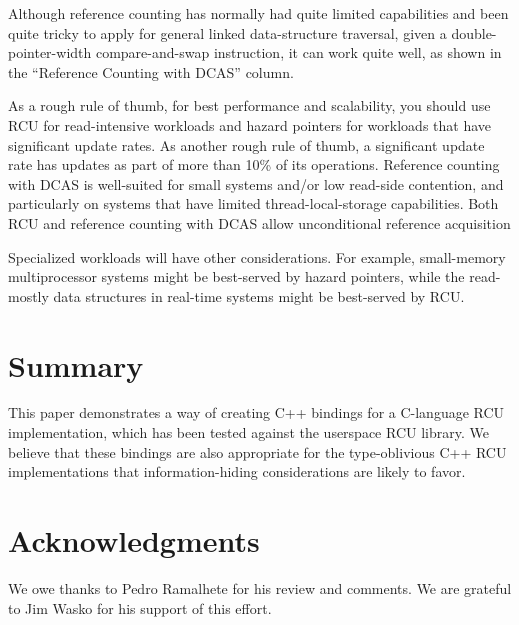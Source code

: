\documentclass[letterpaper,twocolumn,10pt]{article}
\begin{document}
Although reference counting has normally had quite limited capabilities
and been quite tricky to apply for general linked data-structure
traversal, given a double-pointer-width compare-and-swap instruction,
it can work quite well, as shown in the ``Reference Counting with DCAS''
column.

As a rough rule of thumb, for best performance and scalability, you
should use RCU for read-intensive workloads and hazard pointers for
workloads that have significant update rates.
As another rough rule of thumb, a significant update rate has updates
as part of more than 10\% of its operations.
Reference counting with DCAS is well-suited for small systems and/or
low read-side contention, and particularly on systems that have limited
thread-local-storage capabilities.
Both RCU and reference counting with DCAS allow unconditional reference
acquisition

Specialized workloads will have other considerations.
For example, small-memory multiprocessor systems might be best-served by
hazard pointers, while the read-mostly data structures in real-time
systems might be best-served by RCU.

\section{Summary}
\label{sec:Summary}

This paper demonstrates a way of creating C++ bindings for a C-language
RCU implementation, which has been tested against the userspace RCU
library.
We believe that these bindings are also appropriate for the type-oblivious
C++ RCU implementations that information-hiding considerations are likely
to favor.

\section*{Acknowledgments}

We owe thanks to Pedro Ramalhete for his review and comments.
We are grateful to Jim Wasko for his support of this effort.

%
%

%







\end{document}

